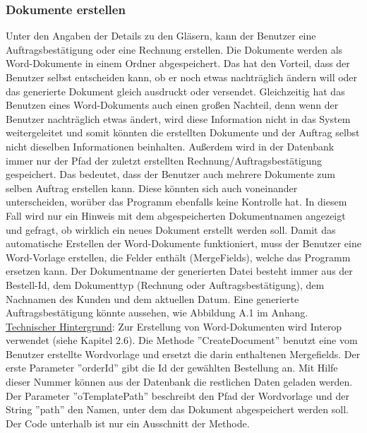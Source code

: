 \subsubsection{Dokumente erstellen}
Unter den Angaben der Details zu den Gläsern, kann der Benutzer eine Auftragsbestätigung oder eine Rechnung erstellen. Die Dokumente werden als Word-Dokumente in einem Ordner abgespeichert. Das hat den Vorteil, dass der Benutzer selbst entscheiden kann, ob er noch etwas nachträglich ändern will oder das generierte Dokument gleich ausdruckt oder versendet. Gleichzeitig hat das Benutzen eines Word-Dokuments auch einen großen Nachteil, denn wenn der Benutzer nachträglich etwas ändert, wird diese Information nicht in das System weitergeleitet und somit könnten die erstellten Dokumente und der Auftrag selbst nicht dieselben Informationen beinhalten. Außerdem wird in der Datenbank immer nur der Pfad der zuletzt erstellten Rechnung/Auftragsbestätigung gespeichert. Das bedeutet, dass der Benutzer auch mehrere Dokumente zum selben Auftrag erstellen kann. Diese könnten sich auch voneinander unterscheiden, worüber das Programm ebenfalls keine Kontrolle hat. In diesem Fall wird nur ein Hinweis mit dem abgespeicherten Dokumentnamen angezeigt und gefragt, ob wirklich ein neues Dokument erstellt werden soll.
\newline Damit das automatische Erstellen der Word-Dokumente funktioniert, muss der Benutzer  eine Word-Vorlage erstellen, die Felder enthält (MergeFields), welche das Programm ersetzen kann. Der Dokumentname der generierten Datei besteht immer aus der Bestell-Id, dem Dokumenttyp (Rechnung oder Auftragsbestätigung), dem Nachnamen des Kunden und dem aktuellen Datum. 
\newline Eine generierte Auftragsbestätigung könnte aussehen, wie Abbildung A.1 im Anhang.
\newline
\noindent \underline{Technischer Hintergrund}: \linebreak
Zur Erstellung von Word-Dokumenten wird Interop verwendet (siehe Kapitel 2.6). Die Methode ''CreateDocument'' benutzt eine vom Benutzer erstellte Wordvorlage und ersetzt die darin enthaltenen Mergefields. Der erste Parameter ''orderId'' gibt die Id der gewählten Bestellung an. Mit Hilfe dieser Nummer können aus der Datenbank die restlichen Daten geladen werden. Der Parameter ''oTemplatePath'' beschreibt den Pfad der Wordvorlage und der String ''path'' den Namen, unter dem das Dokument abgespeichert werden soll. Der Code unterhalb ist nur ein Ausschnitt der Methode.
